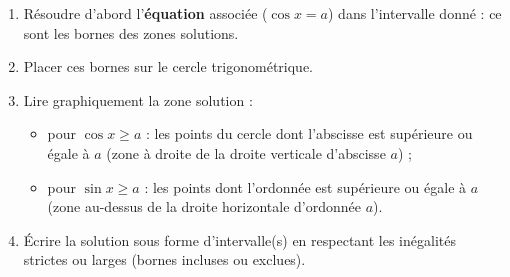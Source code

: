 \documentclass[11pt]{article}
\newcommand{\cle}[1]{{\popxbold\color{popdark}#1}}
\begin{document}
\begin{methode}
\begin{enumerate}
\item Résoudre d'abord l'\textbf{équation} associée ($\cos x = a$) dans l'intervalle donné : ce sont les \cle{bornes} des zones solutions.
\item Placer ces bornes sur le \cle{cercle trigonométrique}.
\item Lire graphiquement la zone solution :
\begin{itemize}
\item pour $\cos x \geq a$ : les points du cercle dont l'abscisse est supérieure ou égale à $a$ (zone à droite de la droite verticale d'abscisse $a$) ;
\item pour $\sin x \geq a$ : les points dont l'ordonnée est supérieure ou égale à $a$ (zone au-dessus de la droite horizontale d'ordonnée $a$).
\end{itemize}
\item Écrire la solution sous forme d'intervalle(s) en respectant les inégalités strictes ou larges (bornes incluses ou exclues).
\end{enumerate}
\end{methode}
\end{document}
